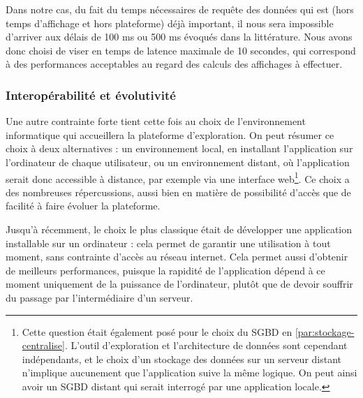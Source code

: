 Dans notre cas, du fait du temps nécessaires de requête des données qui est (hors temps d'affichage et hors plateforme) déjà important, il nous sera impossible d'arriver aux délais de 100 ms ou 500 ms évoqués dans la littérature.
Nous avons donc choisi de viser en temps de latence maximale de 10 secondes, qui correspond à des performances acceptables au regard des calculs des affichages à effectuer.


\subsubsection{Interopérabilité et évolutivité}

Une autre contrainte forte tient cette fois au choix de l'environnement informatique qui accueillera la plateforme d'exploration.
On peut résumer ce choix à deux alternatives : un environnement local, en installant l'application sur l'ordinateur de chaque utilisateur, ou un environnement distant, où l'application serait donc accessible à distance, par exemple via une interface web\footnote{
	Cette question était également posé pour le choix du SGBD en \cref{par:stockage-centralise}.
	L'outil d'exploration et l'architecture de données sont cependant indépendants, et le choix d'un stockage des données sur un serveur distant n'implique aucunement que l'application suive la même logique.
	On peut ainsi avoir un SGBD distant qui serait interrogé par une application locale.
}.
Ce choix a des nombreuses répercussions, aussi bien en matière de possibilité d'accès que de facilité à faire évoluer la plateforme.

Jusqu'à récemment, le choix le plus classique était de développer une application installable sur un ordinateur : cela permet de garantir une utilisation à tout moment, sans contrainte d'accès au réseau internet.
Cela permet aussi d'obtenir de meilleurs performances, puisque la rapidité de l'application dépend à ce moment uniquement de la puissance de l'ordinateur, plutôt que de devoir souffrir du passage par l'intermédiaire d'un serveur.

